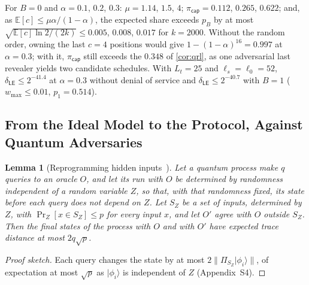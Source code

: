 \documentclass[10pt,journal,compsoc]{IEEEtran}
\theoremstyle{tplain}
\newtheorem{lemma}[theorem]{Lemma}
\theoremstyle{tdef}
\theoremstyle{remark}
\newcommand{\supp}[1]{Appendix~#1}
\begin{document}
\noindent For $B=0$ and $\alpha=0.1$, $0.2$, $0.3$: $\mu=1.14$, $1.5$, $4$; $\pi_{\mathsf{cap}}=0.112$, $0.265$, $0.622$; and, as $\mathbb E[c]\le\mu\alpha/(1-\alpha)$, the expected share exceeds $p_B$ by at most $\sqrt{\mathbb E[c]\ln 2/(2k)}\le 0.005$, $0.008$, $0.017$ for $k=2000$. Without the random order, owning the last $c=4$ positions would give $1-(1-\alpha)^{16}=0.997$ at $\alpha=0.3$; with it, $\pi_{\mathsf{cap}}$ still exceeds the $0.348$ of \cref{cor:qrl}, as one adversarial last revealer yields two candidate schedules. With $L_t=25$ and $\ell_s=\ell_0=52$, $\delta_{\mathsf{LE}}\le2^{-41.4}$ at $\alpha=0.3$ without denial of service and $\delta_{\mathsf{LE}}\le2^{-40.7}$ with $B=1$ ($w_{\max}\le0.01$, $p_1=0.514$).

\subsection{From the Ideal Model to the Protocol, Against Quantum Adversaries}

\begin{lemma}[Reprogramming hidden inputs~\cite{bbbv1997}]\label{lem:bbbv}
Let a quantum process make $q$ queries to an oracle $O$, and let its run with $O$ be determined by randomness independent of a random variable $Z$, so that, with that randomness fixed, its state before each query does not depend on $Z$. Let $S_Z$ be a set of inputs, determined by $Z$, with $\Pr_Z[x\in S_Z]\le p$ for every input $x$, and let $O'$ agree with $O$ outside $S_Z$. Then the final states of the process with $O$ and with $O'$ have expected trace distance at most $2q\sqrt{p}$.
\end{lemma}
\begin{proof}[Proof sketch]
Each query changes the state by at most $2\|\Pi_{S_Z}\lvert\phi_i\rangle\|$, of expectation at most $\sqrt p$ as $\lvert\phi_i\rangle$ is independent of $Z$ (\supp{S4}).
\end{proof}
\end{document}
